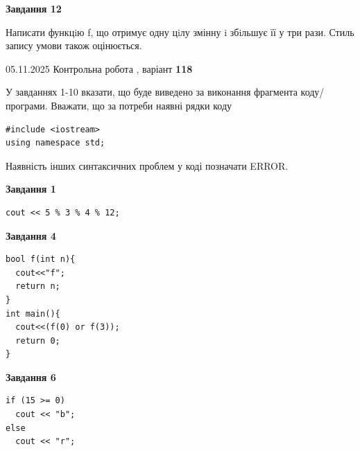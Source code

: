 \documentclass[12pt, ukrainian]{article}
\begin{document}
{\begin {large}
\begin{minipage}[t]{11.0cm}
\begin{center}
\textbf{Завдання 12}
\end{center}

Написати функцiю f, що отримує одну цiлу змінну i збiльшує її у три рази. Стиль запису умови також оцінюється.\par

\end{minipage}

\end {large}}
\newpage

{\Large{05.11.2025 Контрольна робота , варіант  \No \textbf { 118 }\par}}
{
\begin {large}
У завданнях 1-10 вказати, що буде виведено за виконання фрагмента коду/про\-гра\-ми.
Вважати, що за потреби наявні рядки коду
\begin{verbatim}
#include <iostream>
using namespace std;
\end{verbatim}
Наявність інших синтаксичних проблем у коді позначати ERROR.

\begin{minipage}[t]{7.0cm}

\begin{center}
\textbf{Завдання 1}
\end{center}
\vspace{-8mm}

\begin{verbatim}
cout << 5 % 3 % 4 % 12;
\end{verbatim}



\begin{center}
\textbf{Завдання 4}
\end{center}
\vspace{-8mm}

\begin{verbatim}
bool f(int n){
  cout<<"f";
  return n;
}
int main(){
  cout<<(f(0) or f(3));
  return 0;
}
\end{verbatim}



\begin{center}
\textbf{Завдання 6}
\end{center}
\vspace{-8mm}

\begin{verbatim}
if (15 >= 0)
  cout << "b";
else
  cout << "r";
\end{verbatim}




\end{minipage}
\end{large}}
\end{document}

